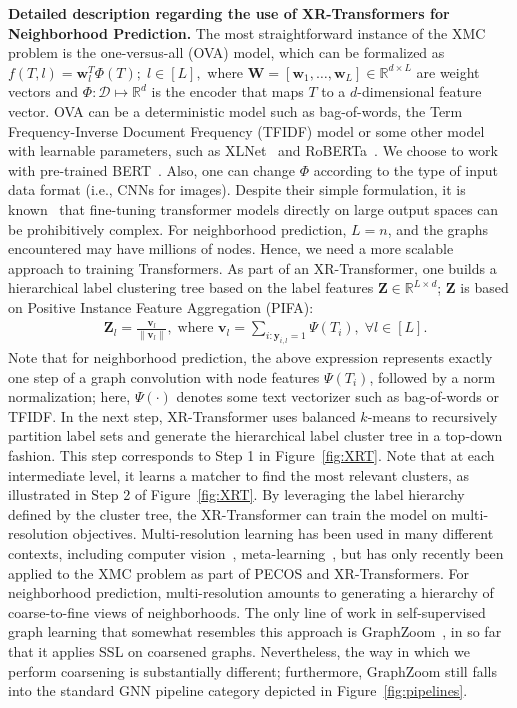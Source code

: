 \documentclass{article} %
\begin{document}
\textbf{Detailed description regarding the use of XR-Transformers for Neighborhood Prediction.}
The most straightforward instance of the XMC problem is the one-versus-all (OVA) model, which can be formalized as $f(T,l) = \mathbf{w}_l^T \Phi(T);\;l\in[L],$ where $\mathbf{W} = [\mathbf{w}_1,\ldots,\mathbf{w}_L]\in \mathbb{R}^{d\times L}$ are weight vectors and $\Phi : \mathcal{D}\mapsto \mathbb{R}^d$ is the encoder that maps $T$ to a $d$-dimensional feature vector. OVA can be a deterministic model such as bag-of-words, the Term Frequency-Inverse Document Frequency (TFIDF) model or some other model with learnable parameters, such as XLNet~\citep{yang2019xlnet} and RoBERTa~\citep{liu2019roberta}. We choose to work with pre-trained BERT~\citep{devlin2018bert}. Also, one can change $\Phi$ according to the type of input data format (i.e., CNNs for images). Despite their simple formulation, it is known~\cite{chang2020taming} that fine-tuning transformer models directly on large output spaces can be prohibitively complex. For neighborhood prediction, $L=n$, and the graphs encountered may have millions of nodes. Hence, we need a more scalable approach to training Transformers. As part of an XR-Transformer, one builds a hierarchical label clustering tree based on the label features $\mathbf{Z}\in \mathbb{R}^{L\times d}$; $\mathbf{Z}$ is based on Positive Instance Feature Aggregation (PIFA):
\begin{align}
 & \mathbf{Z}_l = \frac{\mathbf{v}_l}{\|\mathbf{v}_l\|},\;\text{where }\mathbf{v}_l=\sum_{i:\mathbf{y}_{i,l}=1}\Psi(T_i),\;\forall l\in[L].
\end{align}
Note that for neighborhood prediction, the above expression represents exactly one step of a graph convolution with node features $\Psi(T_i)$, followed by a norm normalization; here, $\Psi(\cdot)$ denotes some text vectorizer such as bag-of-words or TFIDF. In the next step, XR-Transformer uses balanced $k$-means to recursively partition label sets and generate the hierarchical label cluster tree in a top-down fashion. This step corresponds to Step 1 in Figure~\ref{fig:XRT}. Note that at each intermediate level, it learns a matcher to find the most relevant clusters, as illustrated in Step 2 of Figure~\ref{fig:XRT}. By leveraging the label hierarchy defined by the cluster tree, the XR-Transformer can train the model on multi-resolution objectives. Multi-resolution learning has been used in many different contexts, including computer vision~\citep{lai2017deep,karras2017progressive,karras2019style,pedersoli2015coarse}, meta-learning~\citep{liu2019self}, but has only recently been applied to the XMC problem as part of PECOS and XR-Transformers. For neighborhood prediction, multi-resolution amounts to generating a hierarchy of coarse-to-fine views of neighborhoods. The only line of work in self-supervised graph learning that somewhat resembles this approach is GraphZoom~\citep{deng2020graphzoom}, in so far that it applies SSL on coarsened graphs. Nevertheless, the way in which we perform coarsening is substantially different; furthermore, GraphZoom still falls into the standard GNN pipeline category depicted in Figure~\ref{fig:pipelines}.
\end{document}
